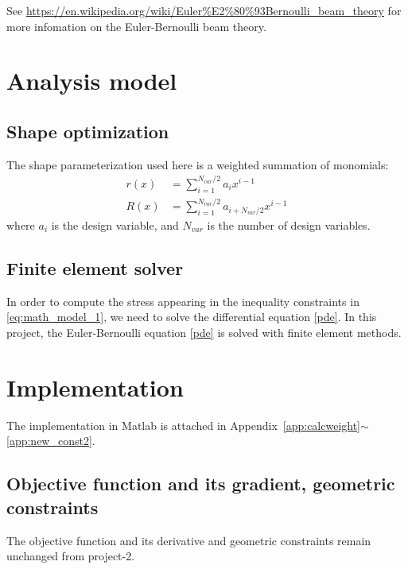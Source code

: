 \documentclass[a4paper]{article}
\begin{document}
See \url{https://en.wikipedia.org/wiki/Euler%E2%80%93Bernoulli_beam_theory} for more infomation on the Euler-Bernoulli beam theory.


\section{Analysis model} \label{sec:analysis_tool}
\subsection{Shape optimization}\label{shape_param}
The shape parameterization used here is a weighted summation of monomials:
\begin{equation}
\begin{aligned}
r(x) &= \sum_{i=1}^{N_{var}/2} a_ix^{i-1}\\
R(x) &= \sum_{i=1}^{N_{var}/2} a_{i+N_{var}/2}x^{i-1}
\end{aligned}
\end{equation}
where $a_i$ is the design variable, and $N_{var}$ is the number of design variables.
\subsection{Finite element solver}
In order to compute the stress appearing in the inequality constraints in \eqref{eq:math_model_1}, we need to solve the differential equation \ref{pde}. In this project, the Euler-Bernoulli equation \eqref{pde} is solved with finite element methods.


\section{Implementation}
The implementation in Matlab is attached in Appendix~\ref{app:calcweight}$\sim$\ref{app:new_const2}. 

\subsection{Objective function and its gradient, geometric constraints}\label{sec:obj}
The objective function and its derivative and geometric constraints remain unchanged from project-2.
\end{document}
